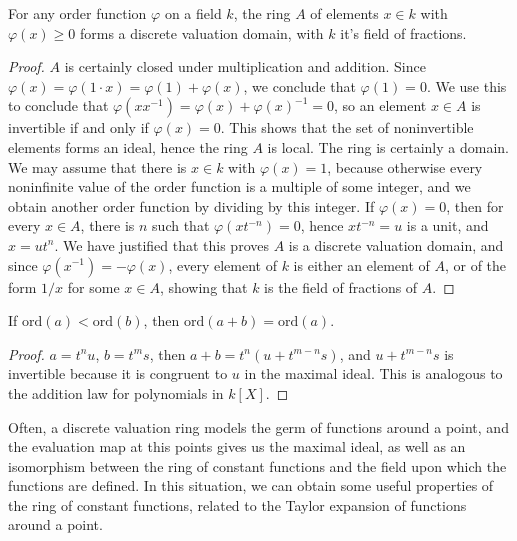 \begin{prop}
    For any order function $\varphi$ on a field $k$, the ring $A$ of elements $x \in k$ with $\varphi(x) \geq 0$ forms a discrete valuation domain, with $k$ it's field of fractions.
\end{prop}
\begin{proof}
    $A$ is certainly closed under multiplication and addition. Since $\varphi(x) = \varphi(1 \cdot x) = \varphi(1) + \varphi(x)$, we conclude that $\varphi(1) = 0$. We use this to conclude that $\varphi(xx^{-1}) = \varphi(x) + \varphi(x)^{-1} = 0$, so an element $x \in A$ is invertible if and only if $\varphi(x) = 0$. This shows that the set of noninvertible elements forms an ideal, hence the ring $A$ is local. The ring is certainly a domain. We may assume that there is $x \in k$ with $\varphi(x) = 1$, because otherwise every noninfinite value of the order function is a multiple of some integer, and we obtain another order function by dividing by this integer. If $\varphi(x) = 0$, then for every $x \in A$, there is $n$ such that $\varphi(xt^{-n}) = 0$, hence $xt^{-n} = u$ is a unit, and $x = ut^n$. We have justified that this proves $A$ is a discrete valuation domain, and since $\varphi(x^{-1}) = -\varphi(x)$, every element of $k$ is either an element of $A$, or of the form $1/x$ for some $x \in A$, showing that $k$ is the field of fractions of $A$.
\end{proof}

\begin{prop}
    If $\text{ord}(a) < \text{ord}(b)$, then $\text{ord}(a + b) = \text{ord}(a)$.
\end{prop}
\begin{proof}
    $a = t^nu$, $b = t^ms$, then $a + b = t^n(u + t^{m-n}s)$, and $u + t^{m-n}s$ is invertible because it is congruent to $u$ in the maximal ideal. This is analogous to the addition law for polynomials in $k[X]$.
\end{proof}

Often, a discrete valuation ring models the germ of functions around a point, and the evaluation map at this points gives us the maximal ideal, as well as an isomorphism between the ring of constant functions and the field upon which the functions are defined. In this situation, we can obtain some useful properties of the ring of constant functions, related to the Taylor expansion of functions around a point.

